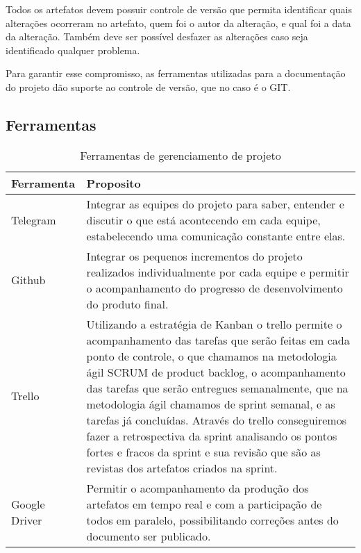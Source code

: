   Todos os artefatos devem possuir controle de versão que permita identificar quais alterações ocorreram no artefato, quem foi o autor da
  alteração, e qual foi a data da alteração. Também deve ser possível desfazer as alterações caso seja identificado qualquer problema.

  Para garantir esse compromisso, as ferramentas utilizadas para a documentação do projeto dão suporte ao controle de versão, que no caso
  é o GIT.

\subsection{Ferramentas}

  \begin{table}[!htb]
    \centering
    \begin{tabular}{p{3cm}p{10cm}}
      \toprule
        \textbf{Ferramenta} & \textbf{Proposito} \\
      \midrule
        Telegram      & Integrar as equipes do projeto para saber, entender e discutir o que está acontecendo em cada equipe, estabelecendo
                        uma comunicação constante entre elas.                 \\ \midrule
        Github        & Integrar os pequenos incrementos do projeto realizados individualmente por cada equipe e permitir o acompanhamento
                        do progresso de desenvolvimento do produto final.           \\ \midrule
        Trello        & Utilizando a estratégia de Kanban o trello permite o acompanhamento das tarefas que serão feitas em cada ponto de
                        controle, o que chamamos na metodologia ágil SCRUM de product backlog, o acompanhamento das tarefas que serão
                        entregues semanalmente, que na metodologia ágil chamamos de sprint semanal, e as tarefas já concluídas. Através
                        do trello conseguiremos fazer a retrospectiva da sprint analisando os pontos fortes e fracos da sprint e sua revisão
                        que são as revistas dos artefatos criados na sprint.          \\ \midrule
        Google Driver & Permitir o acompanhamento da produção dos artefatos em tempo real e com a participação de todos em paralelo,
                        possibilitando correções antes do documento ser publicado.  \\
      \bottomrule
    \end{tabular}
    \caption{Ferramentas de gerenciamento de projeto}
  \end{table}

